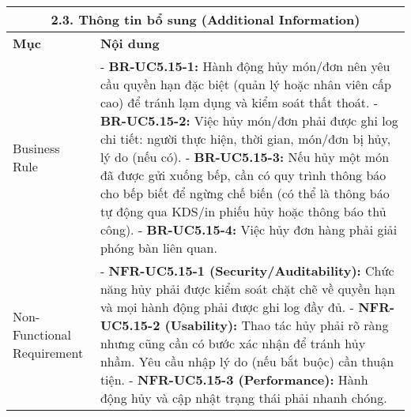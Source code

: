 \begin{longtable}{|m{4cm}|p{11cm}|}
\hline
\multicolumn{2}{|c|}{\textbf{2.3. Thông tin bổ sung (Additional Information)}} \\
\hline
\textbf{Mục} & \textbf{Nội dung} \\
\hline
Business Rule & - \textbf{BR-UC5.15-1:} Hành động hủy món/đơn nên yêu cầu quyền hạn đặc biệt (quản lý hoặc nhân viên cấp cao) để tránh lạm dụng và kiểm soát thất thoát. \newline - \textbf{BR-UC5.15-2:} Việc hủy món/đơn phải được ghi log chi tiết: người thực hiện, thời gian, món/đơn bị hủy, lý do (nếu có). \newline - \textbf{BR-UC5.15-3:} Nếu hủy một món đã được gửi xuống bếp, cần có quy trình thông báo cho bếp biết để ngừng chế biến (có thể là thông báo tự động qua KDS/in phiếu hủy hoặc thông báo thủ công). \newline - \textbf{BR-UC5.15-4:} Việc hủy đơn hàng phải giải phóng bàn liên quan. \\
\hline
Non-Functional Requirement & - \textbf{NFR-UC5.15-1 (Security/Auditability):} Chức năng hủy phải được kiểm soát chặt chẽ về quyền hạn và mọi hành động phải được ghi log đầy đủ. \newline - \textbf{NFR-UC5.15-2 (Usability):} Thao tác hủy phải rõ ràng nhưng cũng cần có bước xác nhận để tránh hủy nhầm. Yêu cầu nhập lý do (nếu bắt buộc) cần thuận tiện. \newline - \textbf{NFR-UC5.15-3 (Performance):} Hành động hủy và cập nhật trạng thái phải nhanh chóng. \\
\hline
\end{longtable}

